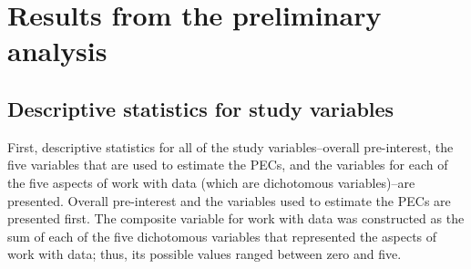 \documentclass[]{book}
\theoremstyle{definition}
\theoremstyle{definition}
\theoremstyle{definition}
\theoremstyle{remark}
\begin{document}
\section{Results from the preliminary
analysis}\label{results-from-the-preliminary-analysis}

\subsection{Descriptive statistics for study
variables}\label{descriptive-statistics-for-study-variables}

First, descriptive statistics for all of the study variables--overall
pre-interest, the five variables that are used to estimate the PECs, and
the variables for each of the five aspects of work with data (which are
dichotomous variables)--are presented. Overall pre-interest and the
variables used to estimate the PECs are presented first. The composite
variable for work with data was constructed as the sum of each of the
five dichotomous variables that represented the aspects of work with
data; thus, its possible values ranged between zero and five.
\end{document}
